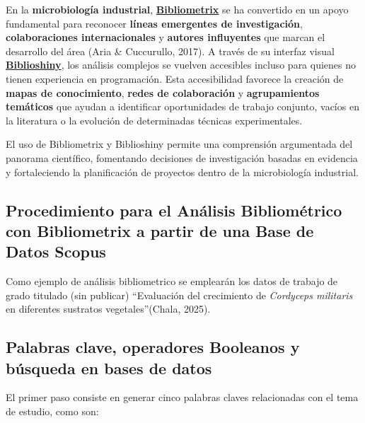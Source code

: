 \documentclass[
  spanish,
  letterpaper,
  DIV=11,
  numbers=noendperiod]{scrreprt}
\begin{document}
En la \textbf{microbiología industrial},
\href{https://www.bibliometrix.org/home/}{\textbf{Bibliometrix}} se ha
convertido en un apoyo fundamental para reconocer \textbf{líneas
emergentes de investigación}, \textbf{colaboraciones internacionales} y
\textbf{autores influyentes} que marcan el desarrollo del área (Aria \&
Cuccurullo, 2017). A través de su interfaz visual
\href{https://www.bibliometrix.org/home/index.php/layout/biblioshiny}{\textbf{Biblioshiny}},
los análisis complejos se vuelven accesibles incluso para quienes no
tienen experiencia en programación. Esta accesibilidad favorece la
creación de \textbf{mapas de conocimiento}, \textbf{redes de
colaboración} y \textbf{agrupamientos temáticos} que ayudan a
identificar oportunidades de trabajo conjunto, vacíos en la literatura o
la evolución de determinadas técnicas experimentales.

El uso de Bibliometrix y Biblioshiny permite una comprensión argumentada
del panorama científico, fomentando decisiones de investigación basadas
en evidencia y fortaleciendo la planificación de proyectos dentro de la
microbiología industrial.

\subsection{Procedimiento para el Análisis Bibliométrico con
Bibliometrix a partir de una Base de Datos
Scopus}\label{procedimiento-para-el-anuxe1lisis-bibliomuxe9trico-con-bibliometrix-a-partir-de-una-base-de-datos-scopus}

Como ejemplo de análisis bibliometrico se emplearán los datos de trabajo
de grado titulado (sin publicar) ``Evaluación del crecimiento de
\emph{Cordyceps militaris} en diferentes sustratos vegetales''(Chala,
2025).

\subsection{Palabras clave, operadores Booleanos y búsqueda en bases de
datos}\label{palabras-clave-operadores-booleanos-y-buxfasqueda-en-bases-de-datos}

El primer paso consiste en generar cinco palabras claves relacionadas
con el tema de estudio, como son:
\end{document}
